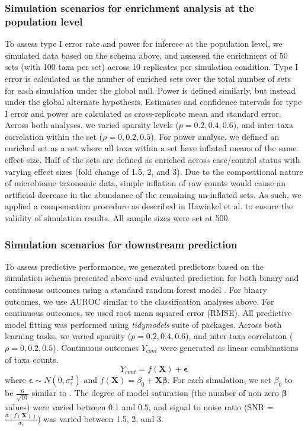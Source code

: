 \documentclass{article}
\begin{document}
\subsubsection{Simulation scenarios for enrichment analysis at the population level}
To assess type I error rate and power for inferece at the population level, we simulated data based on the schema above, and assessed the enrichment of 50 sets (with 100 taxa per set) across 10 replicates per simulation condition. Type I error is calculated as the number of enriched sets over the total number of sets for each simulation under the global null. Power is defined similarly, but instead under the global alternate hypothesis. Estimates and confidence intervals for type I error and power are calculated as cross-replicate mean and standard error. Across both analyses, we varied sparsity levels ($p = 0.2, 0.4, 0.6$), and inter-taxa correlation within the set ($\rho = 0, 0.2, 0.5$). For power analyse, we defined an enriched set as a set where all taxa within a set have inflated means of the same effect size.  Half of the sets are defined as enriched across case/control status with varying effect sizes (fold change of 1.5, 2, and 3). Due to the compositional nature of microbiome taxonomic data, simple inflation of raw counts would cause an artificial decrease in the abundance of the remaining un-inflated sets. As such, we applied a compensation procedure as described in Hawinkel et al. \cite{hawinkel2019} to ensure the validity of simulation results. All sample sizes were set at 500.    

\subsubsection{Simulation scenarios for downstream prediction}
To assess predictive performance, we generated predictors based on the simulation schema presented above and evaluated prediction for both binary and continuous outcomes using a standard random forest model \cite{breiman2001}. For binary outcomes, we use AUROC similar to the classification analyses above. For continuous outcomes, we used root mean squared error (RMSE). All predictive model fitting was performed using \emph{tidymodels} \cite{kuhn2020} suite of packages. Across both learning tasks, we varied sparsity ($p = 0.2, 0.4, 0.6$), and inter-taxa correlation ($\rho = 0, 0.2, 0.5$). Continuous outcomes $Y_{cont}$ were generated as linear combinations of taxa counts.  
\begin{equation}
    Y_{cont} = f(\mathbf{X}) + \mathbf{\epsilon}
\end{equation}
where $\mathbf{\epsilon} \sim N(0, \sigma_{\epsilon}^2)$ and $f(\mathbf{X}) = \beta_0 + \mathbf{X}\mathbf{\beta}$. For each simulation, we set $\beta_0$ to be $\frac{6}{\sqrt{10}}$ similar to \cite{xiao2018}. The degree of model saturation (the number of non zero $\mathbf{\beta}$ values) were varied between 0.1 and 0.5, and signal to noise ratio (SNR = $\frac{\sigma(f(\mathbf{X}))}{\sigma_{\epsilon}}$) was varied between 1.5, 2, and 3. 
\end{document}
